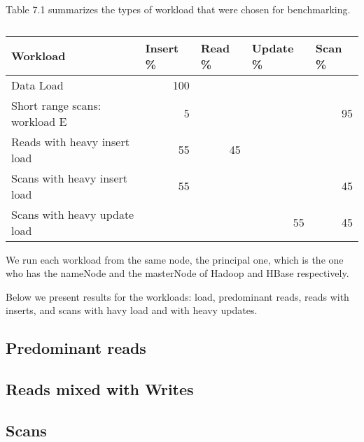 Table 7.1 summarizes the types of workload that were chosen for benchmarking.

\begin{table}[htbp]
\caption{}
\begin{tabular}{|l|r|l|l|l|}
\hline
Workload & \multicolumn{1}{l|}{ Insert \% } & Read \%  & Update \%  & Scan \% \\ \hline
Data Load  & 100 &  &  &  \\ \hline
Short range scans: workload E  & 5 &  &  & \multicolumn{1}{r|}{95} \\ \hline
Reads with heavy insert load  & 55 & \multicolumn{1}{r|}{45} &  &  \\ \hline
Scans with heavy insert load  & 55 &  &  & \multicolumn{1}{r|}{45} \\ \hline
Scans with heavy update load & \multicolumn{1}{l|}{} &  & \multicolumn{1}{r|}{55} & \multicolumn{1}{r|}{45} \\ \hline
\end{tabular}
\label{Table 1 YCSB Workloads.}
\end{table}

We run each workload from the same node, the principal one, which is the one who has the nameNode and the masterNode of Hadoop and HBase respectively.

Below we present results for the workloads: load, predominant reads, reads with inserts, and scans with havy load and with heavy updates.

\subsection{Predominant reads}

\subsection{Reads mixed with Writes}

\subsection{Scans}